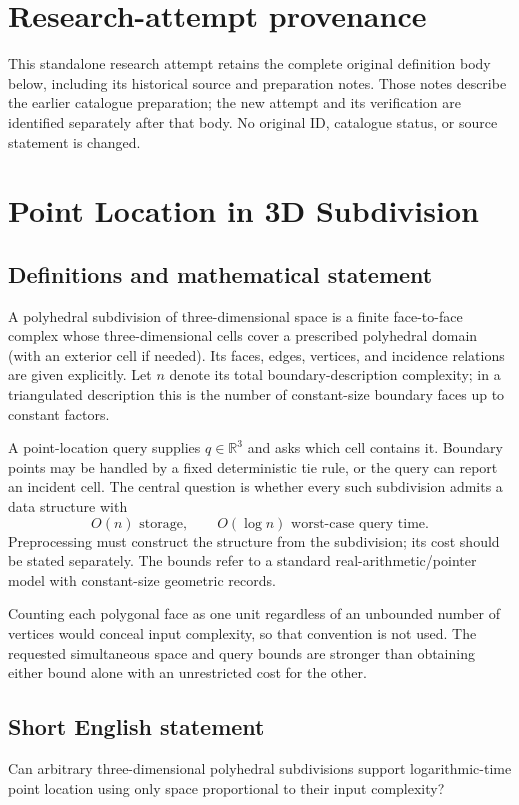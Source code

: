 \documentclass[11pt,a4paper]{article}
\begin{document}
\section*{Research-attempt provenance}
This standalone research attempt retains the complete original definition body below,
including its historical source and preparation notes. Those notes describe the
earlier catalogue preparation; the new attempt and its verification are identified
separately after that body. No original ID, catalogue status, or source statement is changed.

\section*{Point Location in 3D Subdivision}\label{statement}

\subsection{Definitions and mathematical statement}
A polyhedral subdivision of three-dimensional space is a finite
face-to-face complex whose three-dimensional cells cover a prescribed
polyhedral domain (with an exterior cell if needed). Its faces, edges,
vertices, and incidence relations are given explicitly. Let $n$ denote
its total boundary-description complexity; in a triangulated description
this is the number of constant-size boundary faces up to constant factors.

A point-location query supplies $q\in\mathbb R^3$ and asks which cell
contains it. Boundary points may be handled by a fixed deterministic
tie rule, or the query can report an incident cell. The central question
is whether every such subdivision admits a data structure with
\[
                    O(n)\text{ storage},\qquad
                    O(\log n)\text{ worst-case query time}.
\]
Preprocessing must construct the structure from the subdivision; its
cost should be stated separately. The bounds refer to a standard
real-arithmetic/pointer model with constant-size geometric records.

Counting each polygonal face as one unit regardless of an unbounded
number of vertices would conceal input complexity, so that convention
is not used. The requested simultaneous space and query bounds are
stronger than obtaining either bound alone with an unrestricted cost
for the other.
\subsection{Short English statement}
Can arbitrary three-dimensional polyhedral subdivisions support
logarithmic-time point location using only space proportional to their
input complexity?
\end{document}
